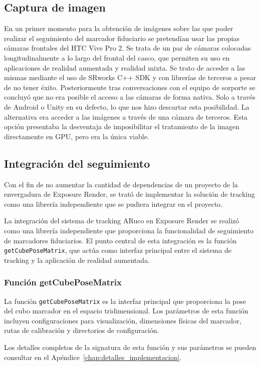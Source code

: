 \subsection{Captura de imagen}
En un primer momento para la obtención de imágenes sobre las que poder realizar el seguimiento del marcador fiduciario se pretendían usar las propias cámaras frontales del HTC Vive Pro 2. Se trata de un par de cámaras colocadas longitudinalmente a lo largo del frontal del casco, que permiten su uso en aplicaciones de realidad aumentada y realidad mixta.
Se trato de acceder a las mismas mediante el uso de SRworks C++ SDK y con librerías de terceros a pesar de no tener éxito. Posteriormente tras conversaciones con el equipo de sorporte se concluyó que no era posible el acceso a las cámaras de forma nativa. Solo a través de Android o Unity en su defecto, lo que nos hizo descartar esta posibilidad.
La alternativa era acceder a las imágenes a través de una cámara de terceros. Esta opción presentaba la desventaja de imposibilitar el tratamiento de la imagen directamente en GPU, pero era la única viable.

\subsection{Integración del seguimiento}
Con el fin de no aumentar la cantidad de dependencias de un proyecto de la envergadura de Exposure Render, se trató de implementar la solución de tracking como una librería independiente que se pudiera integrar en el proyecto.

La integración del sistema de tracking ARuco en Exposure Render se realizó como una librería independiente que proporciona la funcionalidad de seguimiento de marcadores fiduciarios. El punto central de esta integración es la función \texttt{getCubePoseMatrix}, que actúa como interfaz principal entre el sistema de tracking y la aplicación de realidad aumentada.

\subsubsection{Función getCubePoseMatrix}
La función \texttt{getCubePoseMatrix} es la interfaz principal que proporciona la pose del cubo marcador en el espacio tridimensional. Los parámetros de esta función incluyen configuraciones para visualización, dimensiones físicas del marcador, rutas de calibración y directorios de configuración.

Los detalles completos de la signatura de esta función y sus parámetros se pueden consultar en el Apéndice~\ref{chap:detalles_implementacion}.

